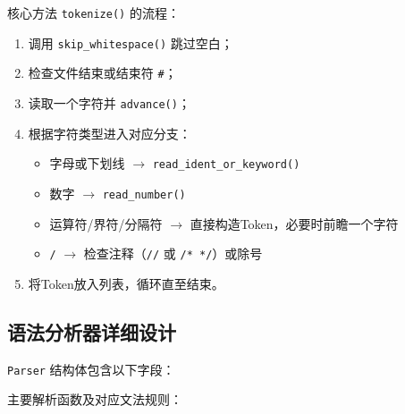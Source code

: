 \documentclass[12pt,a4paper]{ctexart}
\begin{document}
核心方法 \texttt{tokenize()} 的流程：
\begin{enumerate}
    \item 调用 \texttt{skip\_whitespace()} 跳过空白；
    \item 检查文件结束或结束符 \texttt{\#}；
    \item 读取一个字符并 \texttt{advance()}；
    \item 根据字符类型进入对应分支：
          \begin{itemize}
              \item 字母或下划线 $\to$ \texttt{read\_ident\_or\_keyword()}
              \item 数字 $\to$ \texttt{read\_number()}
              \item 运算符/界符/分隔符 $\to$ 直接构造Token，必要时前瞻一个字符
              \item \texttt{/} $\to$ 检查注释（\texttt{//} 或 \texttt{/* */}）或除号
          \end{itemize}
    \item 将Token放入列表，循环直至结束。
\end{enumerate}

\subsection{语法分析器详细设计}

\texttt{Parser} 结构体包含以下字段：


主要解析函数及对应文法规则：
\end{document}
